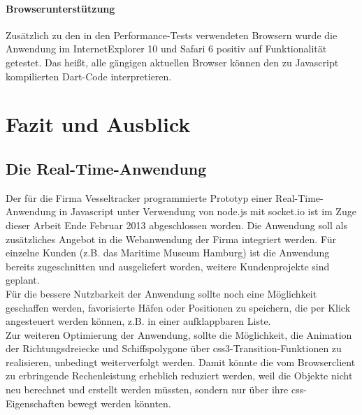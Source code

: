 \subsubsection{Browserunterstützung}
Zusätzlich zu den in den Performance-Tests verwendeten Browsern wurde die Anwendung im InternetExplorer 10 und Safari 6 positiv auf Funktionalität getestet. Das heißt, alle gängigen aktuellen Browser können den zu Javascript kompilierten Dart-Code interpretieren.
\chapter{Fazit und Ausblick}\label{Fazit}

\section{Die Real-Time-Anwendung}
Der für die Firma Vesseltracker programmierte Prototyp einer Real-Time-Anwendung in Javascript unter Verwendung von node.js mit socket.io ist im Zuge dieser Arbeit Ende Februar 2013 abgeschlossen worden. Die Anwendung soll als zusätzliches Angebot in die Webanwendung der Firma integriert werden. Für einzelne Kunden (z.B. das Maritime Museum Hamburg) ist die Anwendung bereits zugeschnitten und ausgeliefert worden, weitere Kundenprojekte sind geplant.\\

Für die bessere Nutzbarkeit der Anwendung sollte noch eine Möglichkeit geschaffen werden, favorisierte Häfen oder Positionen zu speichern, die per Klick angesteuert werden können, z.B. in einer aufklappbaren Liste.\\
Zur weiteren Optimierung der Anwendung, sollte die Möglichkeit, die Animation der Richtungsdreiecke und Schiffspolygone über css3-Transition-Funktionen zu realisieren, unbedingt weiterverfolgt werden. Damit könnte die vom Browserclient zu erbringende Rechenleistung erheblich reduziert werden, weil die Objekte nicht neu berechnet und erstellt werden müssten, sondern nur über ihre css-Eigenschaften bewegt werden könnten.



